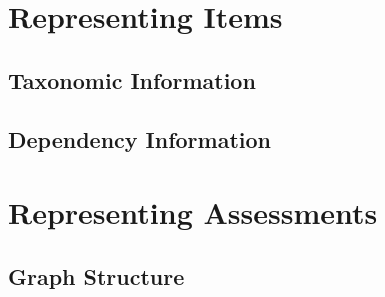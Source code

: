 \section{Representing Items}

\subsection{Taxonomic Information}
\subsection{Dependency Information}

\section{Representing Assessments}

\subsection{Graph Structure}
